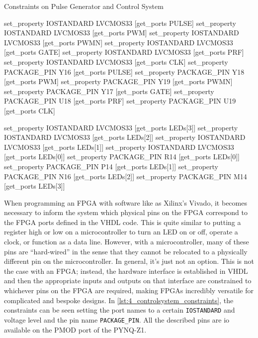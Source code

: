 \begin{listing}[htbp]
	\caption{Constraints on Pulse Generator and Control System}
	\label{lst:4_controlsystem_constraints}
	\begin{mintedvhdl}
set_property IOSTANDARD LVCMOS33 [get_ports PULSE]
set_property IOSTANDARD LVCMOS33 [get_ports PWM]
set_property IOSTANDARD LVCMOS33 [get_ports PWMN]
set_property IOSTANDARD LVCMOS33 [get_ports GATE]
set_property IOSTANDARD LVCMOS33 [get_ports PRF]
set_property IOSTANDARD LVCMOS33 [get_ports CLK]
set_property PACKAGE_PIN Y16 [get_ports PULSE]
set_property PACKAGE_PIN Y18 [get_ports PWM]
set_property PACKAGE_PIN Y19 [get_ports PWMN]
set_property PACKAGE_PIN Y17 [get_ports GATE]
set_property PACKAGE_PIN U18 [get_ports PRF]
set_property PACKAGE_PIN U19 [get_ports CLK]

set_property IOSTANDARD LVCMOS33 [get_ports {LEDs[3]}]
set_property IOSTANDARD LVCMOS33 [get_ports {LEDs[2]}]
set_property IOSTANDARD LVCMOS33 [get_ports {LEDs[1]}]
set_property IOSTANDARD LVCMOS33 [get_ports {LEDs[0]}]
set_property PACKAGE_PIN R14 [get_ports {LEDs[0]}]
set_property PACKAGE_PIN P14 [get_ports {LEDs[1]}]
set_property PACKAGE_PIN N16 [get_ports {LEDs[2]}]
set_property PACKAGE_PIN M14 [get_ports {LEDs[3]}]
	\end{mintedvhdl}
\end{listing}

When programming an FPGA with software like as Xilinx's Vivado, it becomes necessary to inform the system which physical pins on the FPGA correspond to the FPGA ports defined in the VHDL code. This is quite similar to putting a register high or low on a microcontroller to turn an LED on or off, operate a clock, or function as a data line. However, with a microcontroller, many of these pins are \enquote{hard-wired} in the sense that they cannot be relocated to a physically different pin on the microcontroller. In general, it's just not an option. This is not the case with an FPGA; instead, the hardware interface is established in VHDL and then the appropriate inputs and outputs on that interface are constrained to whichever pins on the FPGA are required, making FPGAs incredibly versatile for complicated and bespoke designs. In \cref{lst:4_controlsystem_constraints}, the constraints can be seen setting the port names to a certain \texttt{IOSTANDARD} and voltage level and the pin name \texttt{PACKAGE\_PIN}. All the described pins are \gls{io} available on the PMOD port of the PYNQ-Z1.

